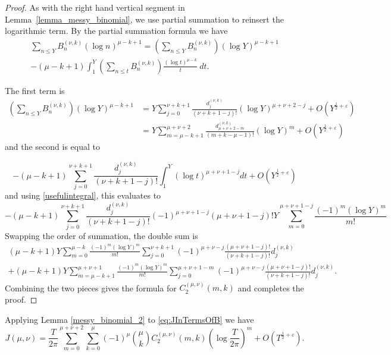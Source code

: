 \documentclass[12pt, a4paper,reqno]{amsart}
\theoremstyle{definition}
\numberwithin{equation}{section}
\begin{document}
\begin{proof}
As with the right hand vertical segment in Lemma~\ref{lemma_messy_binomial}, we use partial summation to reinsert the logarithmic term. 
By the partial summation formula we have \begin{multline*}
    \sum_{n\le Y}B_n^{(\nu,k)}(\log n)^{\mu-k+1}=\left(\sum_{n\le Y}B_n^{(\nu,k)}\right)(\log Y)^{\mu-k+1}\\-(\mu-k+1)\int_1^Y\left(\sum_{n\le t}B_n^{(\nu,k)}\right)\frac{(\log t)^{\mu-k}}{t}\ dt.
\end{multline*}   
    
  The first term is
\begin{align*}
\left(\sum_{n\le Y}B_n^{(\nu,k)}\right)(\log Y)^{\mu-k+1} &= Y \sum_{j=0}^{\nu+k+1} \frac{d_{j}^{(\nu,k)}}{(\nu+k+1-j)!} (\log Y)^{\mu+\nu+2-j} + O\left( Y^{\frac{1}{2}+\varepsilon}\right) \\
&= Y \sum_{m=\mu-k+1}^{\mu+\nu+2} \frac{d_{\mu+\nu+2-m}^{(\nu,k)}}{(m+k-\mu-1)!} (\log Y)^{m} + O\left( Y^{\frac{1}{2}+\varepsilon}\right)
\end{align*}
and the second is equal to

\begin{equation*}
-(\mu-k+1)\sum_{j=0}^{\nu+k+1}\frac{d_{j}^{(\nu,k)}}{(\nu+k+1-j)!} \int_1^Y (\log t)^{\mu+\nu+1-j} dt  +  O\left( Y^{\frac{1}{2}+\varepsilon}\right)
\end{equation*}
and using \eqref{usefulintegral}, this evaluates to
\begin{equation*}
    -(\mu-k+1)\sum_{j=0}^{\nu+k+1}\frac{d_{j}^{(\nu,k)}}{(\nu+k+1-j)!}(-1)^{\mu+\nu+1-j}(\mu+\nu+1-j)!Y\sum_{m=0}^{\mu+\nu+1-j}\frac{(-1)^{m}(\log Y)^{m}}{m!}
\end{equation*}
Swapping the order of summation, the double sum is
\begin{multline*}
(\mu-k+1) Y \sum_{m=0}^{\mu-k} \frac{(-1)^{m}(\log Y)^{m}}{m!}   \sum_{j=0}^{\nu+k+1} (-1)^{\mu+\nu-j} \frac{(\mu+\nu+1-j)!}{(\nu+k+1-j)!} d_{j}^{(\nu,k)}  \\
+(\mu-k+1) Y \sum_{m=\mu-k+1}^{\mu+\nu+1} \frac{(-1)^{m}(\log Y)^{m}}{m!}   \sum_{j=0}^{\mu+\nu+1-m} (-1)^{\mu+\nu-j} \frac{(\mu+\nu+1-j)!}{(\nu+k+1-j)!} d_{j}^{(\nu,k)}.
\end{multline*}
Combining the two pieces gives the formula for $C_2^{(\mu,\nu)}(m,k)$ and completes the proof.
\end{proof}


Applying Lemma \ref{messy_binomial_2} to \eqref{eq:JInTermsOfB} we have
\begin{equation}\label{J1poly_simplified}
    J(\mu,\nu)=\frac{T}{2\pi} \sum_{m=0}^{\mu+\nu+2} \sum_{k=0}^{\mu} (-1)^{\mu} \binom{\mu}{k}   C_2^{(\mu,\nu)}(m,k) \left(\log\frac{T}{2\pi}\right)^m + O\left( T^{\frac{1}{2}+\varepsilon}\right).
\end{equation}
\end{document}
